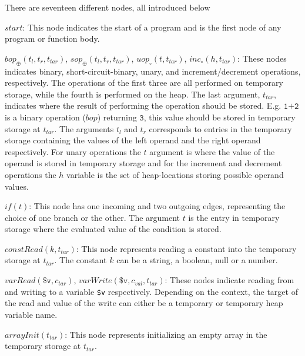 There are seventeen different nodes, all introduced below
\begin{description}
\item{$\mathit{start}$:} This node indicates the start of a program and is the first node of any program or function body. 
\item{$\mathit{bop_{\oplus}}(t_l,t_r, t_{tar})$, $\mathit{sop_{\oplus}}(t_l,t_r, t_{tar})$, $\mathit{uop_{\circ}}(t, t_{tar})$, $\mathit{inc_{\circ}}(h, t_{tar})$:} These nodes indicates binary, short-circuit-binary, unary, and increment/decrement operations, respectively. The operations of the first three are all performed on temporary storage, while the fourth is performed on the heap. The last argument, $t_{tar}$, indicates where the result of performing the operation should be stored. E.g. $\texttt{1+2}$ is a binary operation ($\mathit{bop}$) returning $\texttt{3}$, this value should be stored in temporary storage at $t_{tar}$. The arguments $t_l$ and $t_r$ corresponds to entries in the temporary storage containing the values of the left operand and the right operand respectively. For unary operations the $t$ argument is where the value of the operand is stored in temporary storage and for the increment and decrement operations the $h$ variable is the set of heap-locations storing possible operand values.
\item{$\mathit{if}(t)$:} This node has one incoming and two outgoing edges, representing the choice of one branch or the other. The argument $t$ is the entry in temporary storage where the evaluated value of the condition is stored.
\item{$\mathit{constRead}(k, t_{tar})$:} This node represents reading a constant into the temporary storage at $t_{tar}$. The constant $k$ can be a string, a boolean, null or a number.
\item{$\mathit{varRead}(\texttt{\$v}, c_{tar})$, $\mathit{varWrite}(\texttt{\$v}, c_{val}, t_{tar})$:} These nodes indicate reading from and writing to a variable \texttt{\$v} respectively. Depending on the context, the target of the read and value of the write can either be a temporary or temporary heap variable name. 
\item{$\mathit{arrayInit}(t_{tar})$:} This node represents initializing an empty array in the temporary storage at $t_{tar}$.

\end{description}

